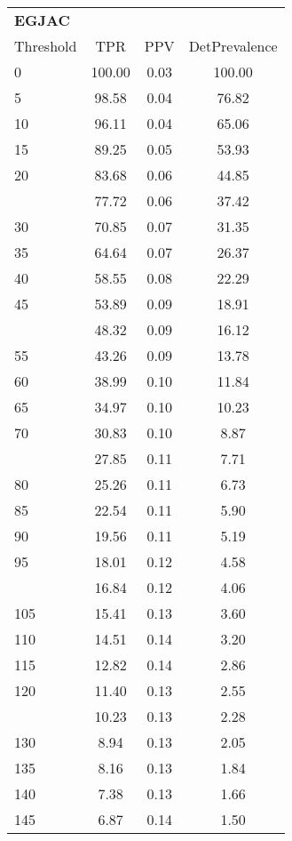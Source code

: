 \begin{table}[ht]
\centering\scriptsize
\begin{tabular}{lccc}
  \toprule
  \multicolumn{4}{l}{\textbf{EGJAC}}\\
Threshold & TPR & PPV & DetPrevalence \\ 
  \midrule
0 & 100.00 & 0.03 & 100.00 \\ 
  5 & 98.58 & 0.04 & 76.82 \\ 
  10 & 96.11 & 0.04 & 65.06 \\ 
  15 & 89.25 & 0.05 & 53.93 \\ 
  20 & 83.68 & 0.06 & 44.85 \\ 
   \addlinespace
25 & 77.72 & 0.06 & 37.42 \\ 
  30 & 70.85 & 0.07 & 31.35 \\ 
  35 & 64.64 & 0.07 & 26.37 \\ 
  40 & 58.55 & 0.08 & 22.29 \\ 
  45 & 53.89 & 0.09 & 18.91 \\ 
   \addlinespace
50 & 48.32 & 0.09 & 16.12 \\ 
  55 & 43.26 & 0.09 & 13.78 \\ 
  60 & 38.99 & 0.10 & 11.84 \\ 
  65 & 34.97 & 0.10 & 10.23 \\ 
  70 & 30.83 & 0.10 & 8.87 \\ 
   \addlinespace
75 & 27.85 & 0.11 & 7.71 \\ 
  80 & 25.26 & 0.11 & 6.73 \\ 
  85 & 22.54 & 0.11 & 5.90 \\ 
  90 & 19.56 & 0.11 & 5.19 \\ 
  95 & 18.01 & 0.12 & 4.58 \\ 
   \addlinespace
100 & 16.84 & 0.12 & 4.06 \\ 
  105 & 15.41 & 0.13 & 3.60 \\ 
  110 & 14.51 & 0.14 & 3.20 \\ 
  115 & 12.82 & 0.14 & 2.86 \\ 
  120 & 11.40 & 0.13 & 2.55 \\ 
   \addlinespace
125 & 10.23 & 0.13 & 2.28 \\ 
  130 & 8.94 & 0.13 & 2.05 \\ 
  135 & 8.16 & 0.13 & 1.84 \\ 
  140 & 7.38 & 0.13 & 1.66 \\ 
  145 & 6.87 & 0.14 & 1.50 \\ 

\end{tabular}
\end{table}

